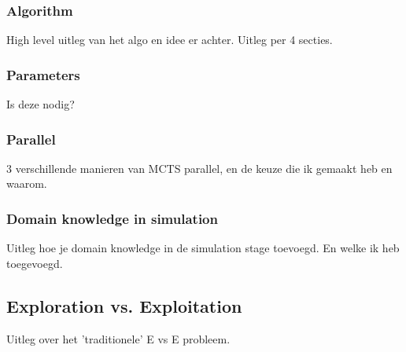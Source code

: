\documentclass[10pt,letterpaper]{article}
\begin{document}
\subsubsection{Algorithm}
High level uitleg van het algo en idee er achter. Uitleg per 4 secties.
\subsubsection{Parameters}
Is deze nodig?
\subsubsection{Parallel}
3 verschillende manieren van MCTS parallel, en de keuze die ik gemaakt heb en waarom.
\subsubsection{Domain knowledge in simulation}
Uitleg hoe je domain knowledge in de simulation stage toevoegd. En welke ik heb toegevoegd.
\subsection{Exploration vs. Exploitation}
Uitleg over het 'traditionele' E vs E probleem.

\printbibliography
\end{document}

